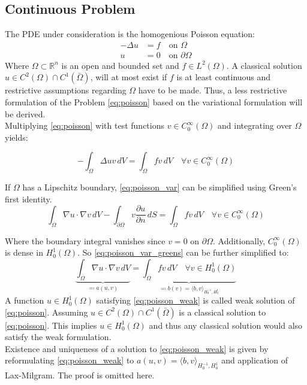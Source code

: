 \documentclass[11pt,a4paper]{article}
\begin{document}
\subsection*{Continuous Problem}
The PDE under consideration is the homogenious Poisson equation:
\begin{equation} \label{eq:poisson}
  \begin{split}
    - \Delta u &= f \quad \text{on } \Omega\\
    u &= 0 \quad \text{on } \partial\Omega
  \end{split}
\end{equation}
Where $\Omega \subset \mathbb{R}^n$ is an open and bounded set and $f \in L^2(\Omega)$.
A classical solution $u \in C^2(\Omega) \cap C^1(\bar{\Omega})$, will at most
exist if $f$ is at least continuous and restrictive assumptions regarding $\Omega$ have to be made.
Thus, a less restrictive formulation of the Problem \ref{eq:poisson} based on
the variational formulation will be derived.\\

Multiplying \ref{eq:poisson} with test functions $v \in C^\infty_0(\Omega)$ and
integrating over $\Omega$ yields:

\begin{equation} \label{eq:poisson_var}
  - \int_\Omega \Delta u v\,dV = \int_\Omega fv\,dV \quad \forall v \in C^\infty_0(\Omega)
\end{equation}

If $\Omega$ has a Lipschitz boundary, \ref{eq:poisson_var} can be simplified
using Green's first identity.
\begin{equation}\label{eq:poisson_var_greens}
    \int_\Omega \nabla u \cdot \nabla v \,dV
  - \int_{\partial\Omega} v \frac{\partial u}{\partial n} \,dS
  = \int_\Omega fv\,dV \quad \forall v \in C^\infty_0(\Omega)
\end{equation}

Where the boundary integral vanishes since $v = 0$ on $\partial\Omega$.
Additionally, $C^\infty_0(\Omega)$ is dense in $H^1_0(\Omega)$.
So \ref{eq:poisson_var_greens} can be further simplified to:
\begin{equation} \label{eq:poisson_weak}
  \underbrace{\int_\Omega \nabla u \cdot \nabla v \,dV}_{\eqqcolon a(u,v)}
  = \underbrace{\int_\Omega fv\,dV \quad \forall v \in
  H^1_0(\Omega)}_{\eqqcolon b(v) = \langle b, v \rangle_{H^{-1}_0, H^1_0}}
\end{equation}
A function $u \in H^1_0(\Omega)$ satisfying \ref{eq:poisson_weak} is called
weak solution of \ref{eq:poisson}.
Assuming $u \in C^2(\Omega) \cap C^1(\bar{\Omega})$ is a classical solution to
\ref{eq:poisson}. This implies $u \in H^1_0(\Omega)$ and thus any classical
solution would also satisfy the weak formulation.\\
Existence and uniqueness of a solution to \ref{eq:poisson_weak} is given by
reformulating \ref{eq:poisson_weak} to $a(u,v) = \langle b,v \rangle_{H^{-1}_0, H^1_0}$
and application of Lax-Milgram. The proof is omitted here.
\end{document}
